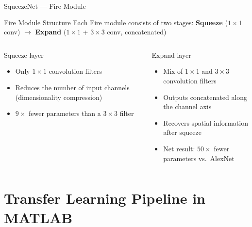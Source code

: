 \documentclass[aspectratio=169,xcolor=dvipsnames]{beamer}
\begin{document}
\begin{frame}{SqueezeNet — Fire Module}
    \begin{block}{Fire Module Structure}
        Each Fire module consists of two stages:
        \quad \textbf{Squeeze} ($1\times1$ conv) $\longrightarrow$ \textbf{Expand} ($1\times1$ + $3\times3$ conv, concatenated)
    \end{block}

    \begin{columns}
        \begin{exampleblock}{Squeeze layer}
            \begin{itemize}
                \item Only $1\times1$ convolution filters
                \item Reduces the number of input channels (dimensionality compression)
                \item $9\times$ fewer parameters than a $3\times3$ filter
            \end{itemize}
        \end{exampleblock}
        \begin{exampleblock}{Expand layer}
            \begin{itemize}
                \item Mix of $1\times1$ and $3\times3$ convolution filters
                \item Outputs concatenated along the channel axis
                \item Recovers spatial information after squeeze
                \item Net result: $50\times$ fewer parameters vs.\ AlexNet
            \end{itemize}
        \end{exampleblock}
    \end{columns}
\end{frame}

\section{Transfer Learning Pipeline in MATLAB}
\end{document}
